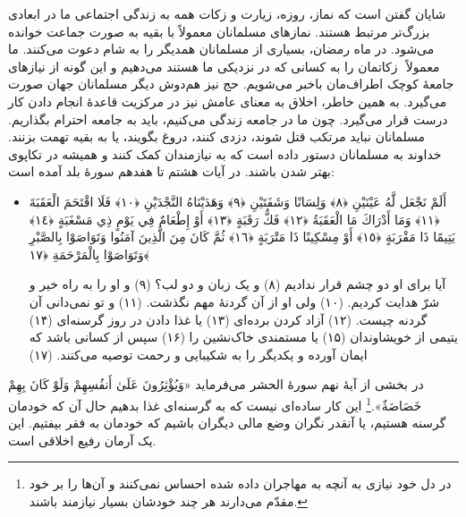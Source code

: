 شایان گفتن است که نماز، روزه، زیارت و  زکات همه به زندگی اجتماعی ما در ابعادی بزرگ‌تر مرتبط هستند. نمازهای مسلمانان معمولاً با بقیه به صورت جماعت خوانده می‌شود. در ماه رمضان، بسیاری از مسلمانان همدیگر را به شام دعوت می‌کنند. ما معمولاً ‌‌ زکاتمان را به کسانی که در نزدیکی ما هستند می‌دهیم و این گونه از نیازهای جامعهٔ کوچک اطراف‌مان باخبر می‌شویم. حج نیز هم‌دوش دیگر مسلمانان جهان صورت می‌گیرد. به همین خاطر، اخلاق به معنای عامش نیز در مرکزیت قاعدهٔ انجام دادن کار درست قرار می‌گیرد. چون ما در جامعه زندگی می‌کنیم، باید به جامعه احترام بگذاریم. مسلمانان نباید مرتکب قتل شوند، دزدی کنند، دروغ بگویند، یا به بقیه تهمت بزنند. خداوند به مسلمانان دستور داده است که به نیازمندان کمک کنند و همیشه در تکاپوی بهتر شدن باشند. در آیات هشتم تا هفدهم سورهٔ بلد آمده است:

\begin{itemize}
	\item[]
	{
		أَلَمْ نَجْعَل لَّهُ عَيْنَيْنِ ﴿٨﴾ وَلِسَانًا وَشَفَتَيْنِ ﴿٩﴾ وَهَدَيْنَاهُ النَّجْدَيْنِ ﴿١٠﴾ فَلَا اقْتَحَمَ الْعَقَبَةَ ﴿١١﴾ وَمَا أَدْرَاكَ مَا الْعَقَبَةُ ﴿١٢﴾ فَكُّ رَقَبَةٍ ﴿١٣﴾ أَوْ إِطْعَامٌ فِي يَوْمٍ ذِي مَسْغَبَةٍ ﴿١٤﴾ يَتِيمًا ذَا مَقْرَبَةٍ ﴿١٥﴾ أَوْ مِسْكِينًا ذَا مَتْرَبَةٍ ﴿١٦﴾ ثُمَّ كَانَ مِنَ الَّذِينَ آمَنُوا وَتَوَاصَوْا بِالصَّبْرِ وَتَوَاصَوْا بِالْمَرْحَمَةِ ﴿١٧﴾}
	
	{
		آیا برای او دو چشم قرار ندادیم (۸) و یک زبان و دو لب؟ (۹) و او را به راه خیر و شرّ هدایت کردیم. (۱۰) ولی او از آن گردنهٔ مهم نگذشت. (۱۱) و تو نمی‌دانی آن گردنه چیست. (۱۲) آزاد کردن برده‌ای (۱۳) یا غذا دادن در روز گرسنه‌‌ای (۱۴) یتیمی از خویشاوندان (۱۵) یا مستمندی خاک‌نشین را (۱۶) سپس از کسانی باشد که ایمان آورده و یکدیگر را به شکیبایی و رحمت توصیه می‌کنند. (۱۷)
	}
\end{itemize}

در بخشی از آیهٔ نهم سورهٔ الحشر می‌فرماید { «وَيُؤْثِرُونَ عَلَىٰ أَنفُسِهِمْ وَلَوْ كَانَ بِهِمْ خَصَاصَةٌ».}\footnote{در دل خود نیازی به آنچه به مهاجران داده شده احساس نمی‌کنند و آن‌ها را بر خود مقدّم می‌دارند هر چند خودشان بسیار نیازمند باشند.} این کار ساده‌ای نیست که به گرسنه‌ای غذا بدهیم حال آن که خودمان گرسنه هستیم، یا آنقدر نگران وضع مالی دیگران باشیم که خودمان به فقر بیفتیم. این یک آرمان رفیع اخلاقی است.

